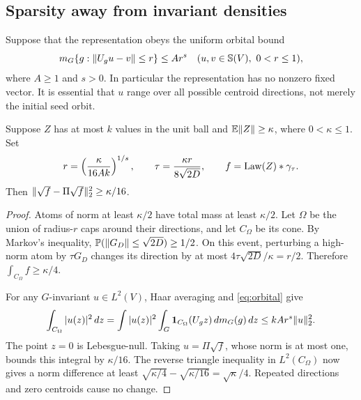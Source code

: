 \subsection{Sparsity away from invariant densities}
Suppose that the representation obeys the uniform orbital bound
\begin{equation}\label{eq:orbital}
 m_G\{g:\lVert U_gu-v\rVert\le r\}\le A r^s
 \quad(u,v\in\mathbb S(V),\ 0<r\le1),
\end{equation}
where $A\ge1$ and $s>0$. In particular the representation has no
nonzero fixed vector. It is essential that $u$ range over all possible
centroid directions, not merely the initial seed orbit.

\begin{lemma}
\label{lem:sparse}
Suppose $Z$ has at most $k$ values in the unit ball and
$\mathbb E\lVert Z\rVert\ge\kappa$, where $0<\kappa\le1$. Set
\begin{equation}\label{eq:scale}
 r=\left(\frac{\kappa}{16Ak}\right)^{1/s},\qquad
 \tau=\frac{\kappa r}{8\sqrt{2D}},\qquad f=\operatorname{Law}(Z)*\gamma_\tau.
\end{equation}
Then $\lVert\sqrt f-\Pi\sqrt f\rVert_2^2\ge\kappa/16$.
\end{lemma}
\begin{proof}
Atoms of norm at least $\kappa/2$ have total mass at least $\kappa/2$.
Let $\Omega$ be the union of radius-$r$ caps around their directions,
and let $C_\Omega$ be its cone. By Markov's inequality,
$\mathbb P(\lVert G_D\rVert\le\sqrt{2D})\ge1/2$. On this event, perturbing a
high-norm atom by $\tau G_D$ changes its direction by at most
$4\tau\sqrt{2D}/\kappa=r/2$. Therefore $\int_{C_\Omega}f\ge\kappa/4$.

For any $G$-invariant $u\in L^2(V)$, Haar averaging and
\eqref{eq:orbital} give
\[
 \int_{C_\Omega}|u(z)|^2\,dz
 =\int |u(z)|^2\int_G\mathbf1_{C_\Omega}(U_gz)\,dm_G(g)\,dz
 \le kAr^s\lVert u\rVert_2^2.
\]
The point $z=0$ is Lebesgue-null. Taking $u=\Pi\sqrt f$, whose norm
is at most one, bounds this integral by $\kappa/16$. The reverse
triangle inequality in $L^2(C_\Omega)$ now gives a norm difference at
least $\sqrt{\kappa/4}-\sqrt{\kappa/16}=\sqrt\kappa/4$.
Repeated directions and zero centroids cause no change.
\end{proof}

